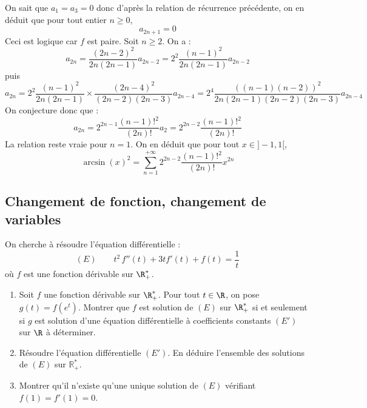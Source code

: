 \documentclass[a4paper,twoside,french,11pt]{VcCours}
\begin{document}
\begin{enumerate}
On sait que $a_1=a_3=0$ donc d'après la relation de récurrence précédente, on en déduit que pour tout entier $n \geq 0$,
$$ a_{2n+1}=0$$
Ceci est logique car $f$ est paire.  Soit $n \geq 2$. On a :
$$ a_{2n} = \dfrac{(2n-2)^2}{2n(2n-1)} a_{2n-2} = 2^2 \dfrac{(n-1)^2}{2n(2n-1)} a_{2n-2}$$
puis
$$ a_{2n} = 2^2 \dfrac{(n-1)^2}{2n(2n-1)} \times \dfrac{(2n-4)^2}{(2n-2)(2n-3)}a_{2n-4} = 2^4 \dfrac{((n-1)(n-2))^2}{2n(2n-1)(2n-2)(2n-3)} a_{2n-4}$$
On conjecture donc que :
$$ a_{2n} = 2^{2n-1} \dfrac{(n-1)!^2}{(2n)!} a_2 = 2^{2n-2} \dfrac{(n-1)!^2}{(2n)!}$$
La relation reste vraie pour $n=1$. On en déduit que pour tout $x \in ]-1,1[$,
$$ \arcsin(x)^2 = \sum_{n=1}^{+ \infty} 2^{2n-2} \dfrac{(n-1)!^2}{(2n)!} x^{2n}$$
\end{enumerate}


\subsection{Changement de fonction, changement de variables}


\begin{Exercice}{} On cherche à résoudre l'équation différentielle :
$$ (E) \qquad t^2\,f''(t) + 3 t f'(t)+f(t)  = \dfrac{1}{t} $$
où $f$ est une fonction dérivable sur $\R_+^*$.
\begin{enumerate}
\item Soit $f$ une fonction dérivable sur $\R_+^*$. Pour tout $t\in \R$, on pose $g(t)=f(e^{t})$. Montrer que $f$ est solution de $(E)$ sur $\R_+^*$ si et seulement si $g$ est solution d'une équation différentielle à coefficients constants $(E')$ sur $\R$ à déterminer.
\item Résoudre l'équation différentielle $(E')$. En déduire l'ensemble des solutions de $(E)$ sur $\mathbb{R}^*_+$.
\item Montrer qu'il n'existe qu'une unique solution de $(E)$ vérifiant $f(1)=f'(1)=0$.
\end{enumerate}
\end{Exercice}
\end{document}
